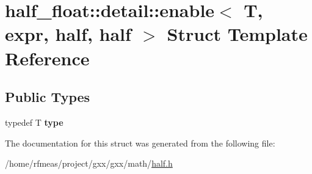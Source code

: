 \hypertarget{structhalf__float_1_1detail_1_1enable_3_01T_00_01expr_00_01half_00_01half_01_4}{}\section{half\+\_\+float\+:\+:detail\+:\+:enable$<$ T, expr, half, half $>$ Struct Template Reference}
\label{structhalf__float_1_1detail_1_1enable_3_01T_00_01expr_00_01half_00_01half_01_4}
\subsection*{Public Types}
\begin{DoxyCompactItemize}
\item 
typedef T {\bfseries type}\hypertarget{structhalf__float_1_1detail_1_1enable_3_01T_00_01expr_00_01half_00_01half_01_4_a48d3328de918e7e975e2c2f8c22d0833}{}\label{structhalf__float_1_1detail_1_1enable_3_01T_00_01expr_00_01half_00_01half_01_4_a48d3328de918e7e975e2c2f8c22d0833}

\end{DoxyCompactItemize}


The documentation for this struct was generated from the following file\+:\begin{DoxyCompactItemize}
\item 
/home/rfmeas/project/gxx/gxx/math/\hyperlink{half_8h}{half.\+h}\end{DoxyCompactItemize}
